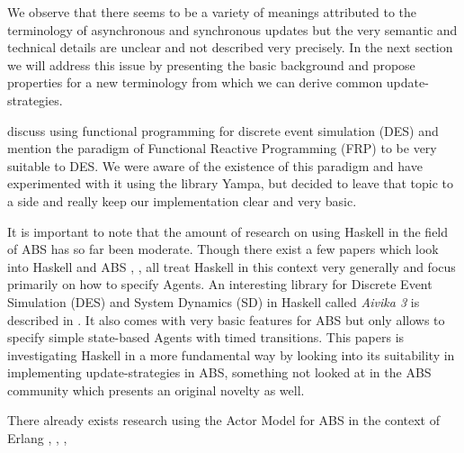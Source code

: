 \medskip

We observe that there seems to be a variety of meanings attributed to the terminology of asynchronous and synchronous updates but the very semantic and technical details are unclear and not described very precisely. In the next section we will address this issue by presenting the basic background and propose properties for a new terminology from which we can derive common update-strategies.



\cite{jankovic_functional_2007} discuss using functional programming for discrete event simulation (DES) and mention the paradigm of Functional Reactive Programming (FRP) to be very suitable to DES. We were aware of the existence of this paradigm and have experimented with it using the library Yampa, but decided to leave that topic to a side and really keep our implementation clear and very basic.

It is important to note that the amount of research on using Haskell in the field of ABS has so far been moderate. Though there exist a few papers which look into Haskell and ABS \cite{de_jong_suitability_2014}, \cite{sulzmann_specifying_2007}, \cite{jankovic_functional_2007} all treat Haskell in this context very generally and focus primarily on how to specify Agents. An interesting library for Discrete Event Simulation (DES) and System Dynamics (SD) in Haskell called \textit{Aivika 3} is described in \cite{sorokin_aivika_2015}. It also comes with very basic features for ABS but only allows to specify simple state-based Agents with timed transitions. This papers is investigating Haskell in a more fundamental way by looking into its suitability in implementing update-strategies in ABS, something not looked at in the ABS community which presents an original novelty as well.

There already exists research using the Actor Model for ABS in the context of Erlang \cite{varela_modelling_2004}, \cite{di_stefano_using_2005}, \cite{di_stefano_exat:_2007}, \cite{sher_agent-based_2013}